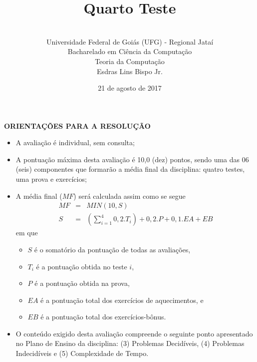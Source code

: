 \documentclass[12pt,a4paper,oneside]{article}
\author{\\Universidade Federal de Goiás (UFG) - Regional  Jataí\\Bacharelado em Ciência da Computação \\Teoria da Computação \\Esdras Lins Bispo Jr.}
\date{21 de agosto de 2017}
\title{\sc \huge Quarto Teste}
\begin{document}
\maketitle

{\bf ORIENTAÇÕES PARA A RESOLUÇÃO}

\small
 
\begin{itemize}
	\item A avaliação é individual, sem consulta;
	\item A pontuação máxima desta avaliação é 10,0 (dez) pontos, sendo uma das 06 (seis) componentes que formarão a média final da disciplina: quatro testes, uma prova e exercícios;
	\item A média final ($MF$) será calculada assim como se segue
	\begin{eqnarray}
		MF & = & MIN(10, S) \nonumber \\
		S & = & (\sum_{i=1}^{4} 0,2.T_i ) + 0,2.P  + 0,1.EA + EB\nonumber
	\end{eqnarray}
	em que 
	\begin{itemize}
		\item $S$ é o somatório da pontuação de todas as avaliações,
		\item $T_i$ é a pontuação obtida no teste $i$,
		\item $P$ é a pontuação obtida na prova,
		\item $EA$ é a pontuação total dos exercícios de aquecimentos, e
		\item $EB$ é a pontuação total dos exercícios-bônus.
	\end{itemize}
	\item O conteúdo exigido desta avaliação compreende o seguinte ponto apresentado no Plano de Ensino da disciplina:  (3) Problemas Decidíveis, (4) Problemas Indecidíveis e (5) Complexidade de Tempo.
\end{itemize}

\begin{center}
\end{center}\newpage
\end{document}

